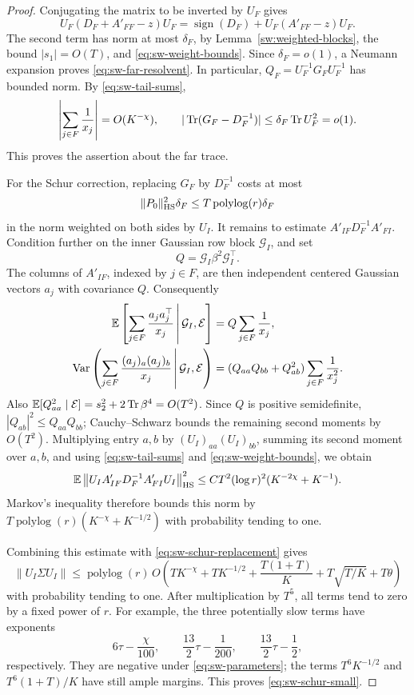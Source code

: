 \begin{proof}
Conjugating the matrix to be inverted by \(U_F\) gives
\[
 U_F(D_F+A'_{FF}-z)U_F
 =\operatorname{sign}(D_F)+U_F(A'_{FF}-z)U_F.
\]
The second term has norm at most \(\delta_F\), by
Lemma~\ref{sw:weighted-blocks}, the bound \(|s_1|=O(T)\), and
\eqref{eq:sw-weight-bounds}. Since \(\delta_F=o(1)\), a Neumann expansion
proves \eqref{eq:sw-far-resolvent}. In particular,
\(Q_F=U_F^{-1}G_FU_F^{-1}\) has bounded norm.
By \eqref{eq:sw-tail-sums},
\[
 \left|\sum_{j\in F}\frac1{x_j}\right|=O(K^{-\chi}),
 \qquad
 |\operatorname{Tr}(G_F-D_F^{-1})|
 \le\delta_F\operatorname{Tr} U_F^2=o(1).
\]
This proves the assertion about the far trace.

For the Schur correction, replacing \(G_F\) by \(D_F^{-1}\) costs at most
\begin{equation}\label{eq:sw-schur-replacement}
 \|P_0\|_{\mathrm{HS}}^2\delta_F
 \le T\operatorname{polylog}(r)\delta_F
\end{equation}
in the norm weighted on both sides by \(U_I\).
It remains to estimate
\(A'_{IF}D_F^{-1}A'_{FI}\).
Condition further on the inner Gaussian row block \(\mathcal G_I\), and set
\[
 Q=\mathcal G_I\beta^2\mathcal G_I^\top.
\]
The columns of \(A'_{IF}\), indexed by \(j\in F\), are then independent
centered Gaussian vectors \(a_j\) with covariance \(Q\).
Consequently
\begin{align*}
 \mathbb E\left[\sum_{j\in F}\frac{a_ja_j^\top}{x_j}
       \,\middle|\,\mathcal G_I,\mathcal E\right]
 &=Q\sum_{j\in F}\frac1{x_j},\\
 \operatorname{Var}\left(\sum_{j\in F}\frac{(a_j)_a(a_j)_b}{x_j}
       \,\middle|\,\mathcal G_I,\mathcal E\right)
 &=(Q_{aa}Q_{bb}+Q_{ab}^2)
       \sum_{j\in F}\frac1{x_j^2}.
\end{align*}
Also
\(\mathbb E[Q_{aa}^2\mid\mathcal E]
 =s_2^2+2\operatorname{Tr}\beta^4=O(T^2)\).
Since \(Q\) is positive semidefinite,
\(|Q_{ab}|^2\le Q_{aa}Q_{bb}\); Cauchy--Schwarz bounds the remaining
second moments by \(O(T^2)\).
Multiplying entry \(a,b\) by \((U_I)_{aa}(U_I)_{bb}\), summing its second
moment over \(a,b\), and using \eqref{eq:sw-tail-sums} and
\eqref{eq:sw-weight-bounds}, we obtain
\[
 \mathbb E\left\|
 U_IA'_{IF}D_F^{-1}A'_{FI}U_I
 \right\|_{\mathrm{HS}}^2
 \le C T^2(\log r)^2(K^{-2\chi}+K^{-1}).
\]
Markov's inequality therefore bounds this norm by
\(T\operatorname{polylog}(r)(K^{-\chi}+K^{-1/2})\) with probability
tending to one.

Combining this estimate with \eqref{eq:sw-schur-replacement} gives
\[
 \|U_I\Sigma U_I\|
 \le \operatorname{polylog}(r)\,O\left(
 TK^{-\chi}+TK^{-1/2}+\frac{T(1+T)}K
       +T\sqrt{T/K}+T\theta\right)
\]
with probability tending to one. After multiplication by \(T^5\), all
terms tend to zero by a fixed power of \(r\). For example, the three
potentially slow terms have exponents
\[
 6\tau-\frac{\chi}{100},\qquad
 \frac{13}{2}\tau-\frac1{200},\qquad
 \frac{13}{2}\tau-\frac12,
\]
respectively. They are negative under \eqref{eq:sw-parameters}; the terms
\(T^6K^{-1/2}\) and \(T^6(1+T)/K\) have still ample margins.
This proves \eqref{eq:sw-schur-small}.
\end{proof}

